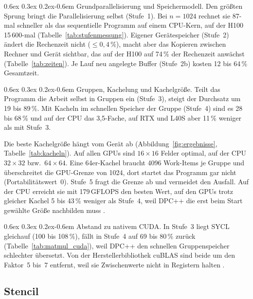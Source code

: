 \documentclass[12pt,a4paper]{article}
\makeatletter
\renewcommand\paragraph{\@startsection{paragraph}{4}{\z@}%
    {0.6ex \@plus 0.3ex \@minus 0.2ex}{-0.6em}%
    {\normalfont\normalsize\bfseries}}
\makeatother
\begin{document}
\paragraph{Grundparallelisierung und Speichermodell.}
Den größten Sprung bringt die Parallelisierung selbst (Stufe~1). Bei $n = 1024$
rechnet sie 87-mal schneller als das sequentielle Programm auf einem CPU-Kern,
auf der H100 15\,600-mal (Tabelle~\ref{tab:stufenmessung}). Eigener
Gerätespeicher (Stufe~2) ändert die Rechenzeit nicht ($\le 0{,}4\,\%$), macht
aber das Kopieren zwischen Rechner und Gerät sichtbar, das auf der H100 auf
74\,\% der Rechenzeit anwächst (Tabelle~\ref{tab:zeiten}). Je Lauf neu angelegte Buffer (Stufe~2b) kosten 12 bis 64\,\% Gesamtzeit.

\paragraph{Gruppen, Kachelung und Kachelgröße.}
Teilt das Programm die Arbeit selbst in Gruppen ein (Stufe~3), steigt der
Durchsatz um 19 bis 89\,\%. Mit Kacheln im schnellen Speicher der Gruppe
(Stufe~4) sind es 28 bis 68\,\% und auf der CPU das 3,5-Fache, auf RTX und L40S
aber 11\,\% weniger als mit Stufe~3.

Die beste Kachelgröße hängt vom Gerät ab (Abbildung~\ref{fig:ergebnisse},
Tabelle~\ref{tab:kacheln}). Auf allen GPUs sind $16 \times 16$ Felder optimal,
auf der CPU $32 \times 32$ bzw.\ $64 \times 64$. Eine 64er-Kachel braucht 4096
Work-Items je Gruppe und überschreitet die GPU-Grenze von 1024, dort startet das
Programm gar nicht (Portabilitätswert~0). Stufe~5 fragt die Grenze ab und
vermeidet den Ausfall. Auf der CPU erreicht sie mit 179\,GFLOPS den
besten Wert, auf den GPUs trotz gleicher Kachel 5 bis 43\,\% weniger als
Stufe~4, weil DPC++ die erst beim Start gewählte Größe nachbilden muss
\cite{dpcpp_spec_const}.

\paragraph{Abstand zu nativem CUDA.}
In Stufe~3 liegt SYCL gleichauf (100 bis 108\,\%), fällt in Stufe~4 auf 69 bis
80\,\% zurück (Tabelle~\ref{tab:matmul_cuda}), weil DPC++ den schnellen
Gruppenspeicher schlechter übersetzt. Von der Herstellerbibliothek cuBLAS
\cite{nvidia_cublas} sind beide um den Faktor~5 bis~7 entfernt, weil sie
Zwischenwerte nicht in Registern halten \cite{volkov2008gemm}.

\subsection{Stencil}\label{sec:e-stencil}
\end{document}
